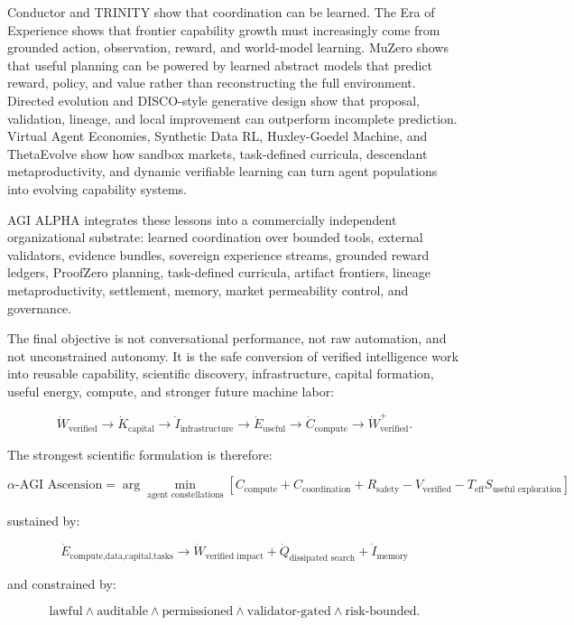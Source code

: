 \documentclass[11pt]{article}
\begin{document}
Conductor and TRINITY show that coordination can be learned. The Era of Experience shows that frontier capability growth must increasingly come from grounded action, observation, reward, and world-model learning. MuZero shows that useful planning can be powered by learned abstract models that predict reward, policy, and value rather than reconstructing the full environment. Directed evolution and DISCO-style generative design show that proposal, validation, lineage, and local improvement can outperform incomplete prediction. Virtual Agent Economies, Synthetic Data RL, Huxley-Goedel Machine, and ThetaEvolve show how sandbox markets, task-defined curricula, descendant metaproductivity, and dynamic verifiable learning can turn agent populations into evolving capability systems.

AGI ALPHA integrates these lessons into a commercially independent organizational substrate: learned coordination over bounded tools, external validators, evidence bundles, sovereign experience streams, grounded reward ledgers, ProofZero planning, task-defined curricula, artifact frontiers, lineage metaproductivity, settlement, memory, market permeability control, and governance.

The final objective is not conversational performance, not raw automation, and not unconstrained autonomy. It is the safe conversion of verified intelligence work into reusable capability, scientific discovery, infrastructure, capital formation, useful energy, compute, and stronger future machine labor:

\[
\dot W_{\mathrm{verified}}\rightarrow\dot K_{\mathrm{capital}}\rightarrow\dot I_{\mathrm{infrastructure}}\rightarrow\dot E_{\mathrm{useful}}\rightarrow\dot C_{\mathrm{compute}}\rightarrow\dot W_{\mathrm{verified}}^{+}.
\]

The strongest scientific formulation is therefore:

\[
\boxed{
\alpha\text{-AGI Ascension}
=
\arg\min_{\text{agent constellations}}
\left[
C_{\text{compute}}+C_{\text{coordination}}+R_{\text{safety}}-V_{\text{verified}}-T_{\text{eff}}S_{\text{useful exploration}}
\right]
}
\]

sustained by:

\[
\boxed{
\dot{E}_{\text{compute,data,capital,tasks}}
\rightarrow
\dot{W}_{\text{verified impact}}
+
\dot{Q}_{\text{dissipated search}}
+
\dot{I}_{\text{memory}}
}
\]

and constrained by:

\[
\boxed{
\text{lawful}\land\text{auditable}\land\text{permissioned}\land\text{validator-gated}\land\text{risk-bounded}.
}
\]
\end{document}
